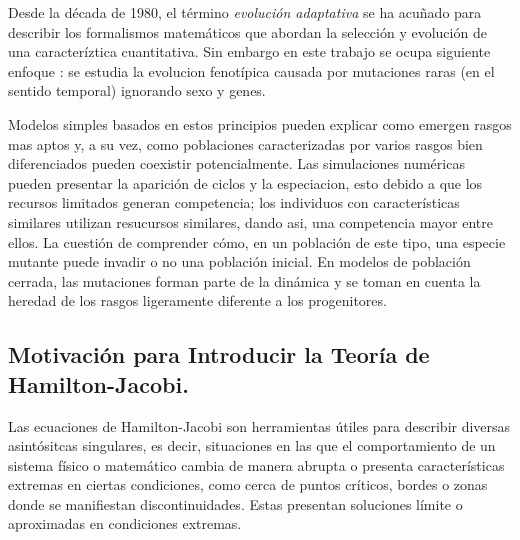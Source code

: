 {{            \normalsize{\citep{Mirrahimi} Desde la década de 1980, el término \textit{evolución adaptativa} se ha acuñado para describir los formalismos matemáticos que abordan la selección y evolución de una caracter\'iztica cuantitativa. Sin embargo en este trabajo se ocupa siguiente enfoque \citep{Dieckmann1996, metz96}: se estudia la evoluci\;on fenot\'ipica causada por mutaciones raras (en el sentido temporal) ignorando sexo y genes.}

%                    
%
%                    
%                    
%                    
%                    
%
                
            \normalsize{Modelos simples basados en estos principios pueden explicar como emergen rasgos mas aptos y, a su vez, como poblaciones caracterizadas por varios rasgos bien diferenciados pueden coexistir potencialmente. Las simulaciones numéricas pueden presentar la aparición de ciclos y la especiacion, esto debido a que los recursos limitados generan competencia; los individuos con características similares utilizan resucursos similares, dando asi, una competencia mayor entre ellos. La cuestión de comprender cómo, en un población de este tipo, una especie mutante puede invadir o no una población inicial. En modelos de población cerrada, las mutaciones forman parte de la dinámica y se toman en cuenta la heredad de los rasgos ligeramente diferente a los progenitores.}
        }
        
        \subsection{Motivación para Introducir la Teoría de Hamilton-Jacobi.}

            \normalsize{\citep{Barles2006} Las ecuaciones de Hamilton-Jacobi son herramientas útiles para describir diversas asintósitcas singulares, es decir, situaciones en las que el comportamiento de un sistema físico o matemático cambia  de manera abrupta o presenta características extremas en ciertas condiciones, como cerca de puntos críticos, bordes o zonas donde se manifiestan discontinuidades. Estas presentan soluciones límite o aproximadas en condiciones extremas.
            }\\

}
